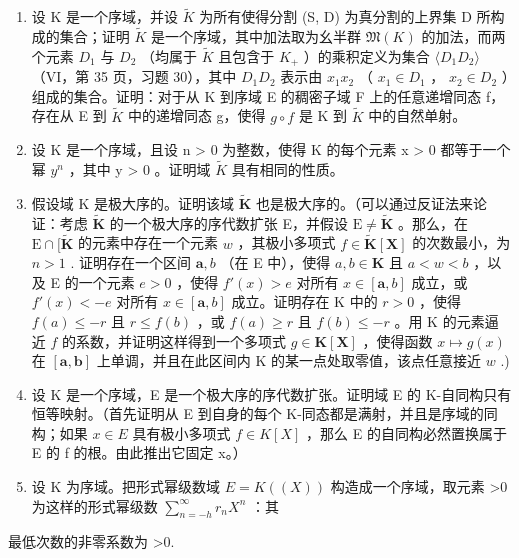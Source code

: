 \begin{enumerate}
\def\labelenumi{\arabic{enumi})}
\setcounter{enumi}{35}
\item
  设 K 是一个序域，并设 \(\tilde{K}\) 为所有使得分割 (S, D) 为真分割的上界集 D 所构成的集合；证明 \(\tilde{K}\) 是一个序域，其中加法取为幺半群 \(\mathfrak{M}(K)\) 的加法，而两个元素 \(D_{1}\) 与 \(D_{2}\) （均属于 \(\tilde{K}\) 且包含于 \(K_{+}\) ）的乘积定义为集合 \(\langle D_{1}D_{2}\rangle\) （VI，第 35 页，习题 30），其中 \(D_{1}D_{2}\) 表示由 \(x_{1}x_{2}\) （ \(x_{1}\in D_{1}\) ， \(x_{2}\in D_{2}\) ）组成的集合。证明：对于从 K 到序域 E 的稠密子域 F 上的任意递增同态 f，存在从 E 到 \(\tilde{K}\) 中的递增同态 g，使得 \(g\circ f\) 是 K 到 \(\tilde{K}\) 中的自然单射。
\item
  设 K 是一个序域，且设 n \textgreater{} 0 为整数，使得 K 的每个元素 x \textgreater{} 0 都等于一个幂 \(y^{n}\) ，其中 y \textgreater{} 0 。证明域 \(\tilde{K}\) 具有相同的性质。
\item
  假设域 K 是极大序的。证明该域 \(\tilde{\mathbf{K}}\) 也是极大序的。（可以通过反证法来论证：考虑 \(\tilde{\mathbf{K}}\) 的一个极大序的序代数扩张 E，并假设 \(\mathrm{E} \neq \tilde{\mathbf{K}}\) 。那么，在 \(\mathrm{E} \cap [\tilde{\mathbf{K}}\) 的元素中存在一个元素 \(w\) ，其极小多项式 \(f \in \tilde{\mathbf{K}}[\mathbf{X}]\) 的次数最小，为 \(n > 1\) . 证明存在一个区间 \(\mathbf{a}, b\) （在 E 中），使得 \(a, b \in \mathbf{K}\) 且 \(a < w < b\) ，以及 E 的一个元素 \(e > 0\) ，使得 \(f'(x) > e\) 对所有 \(x \in [\mathbf{a}, b]\) 成立，或 \(f'(x) < -e\) 对所有 \(x \in [\mathbf{a}, b]\) 成立。证明存在 K 中的 \(r > 0\) ，使得 \(f(a) \leqslant -r\) 且 \(r \leqslant f(b)\) ，或 \(f(a) \geqslant r\) 且 \(f(b) \leqslant -r\) 。用 K 的元素逼近 \(f\) 的系数，并证明这样得到一个多项式 \(g \in \mathbf{K}[\mathbf{X}]\) ，使得函数 \(x \mapsto g(x)\) 在 \([\mathbf{a}, \mathbf{b}]\) 上单调，并且在此区间内 K 的某一点处取零值，该点任意接近 \(w\) .)
\item
  设 K 是一个序域，E 是一个极大序的序代数扩张。证明域 E 的 K-自同构只有恒等映射。（首先证明从 E 到自身的每个 K-同态都是满射，并且是序域的同构；如果 \(x \in E\) 具有极小多项式 \(f \in K[X]\) ，那么 E 的自同构必然置换属于 E 的 f 的根。由此推出它固定 x。）
\item
  设 K 为序域。把形式幂级数域 \(E = K((X))\) 构造成一个序域，取元素 \textgreater0 为这样的形式幂级数 \(\sum_{n=-h}^{\infty} r_n X^n\) ：其
\end{enumerate}

最低次数的非零系数为 \textgreater0.

